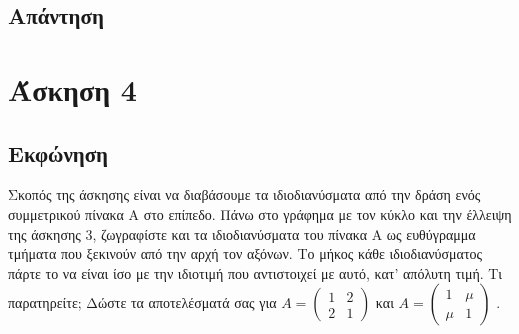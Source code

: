 \documentclass[a4paper,12pt]{article}
\begin{document}
\subsection{Απάντηση}
\newpage\section{Άσκηση 4}
\subsection{Εκφώνηση}
Σκοπός της άσκησης είναι να διαβάσουμε τα ιδιοδιανύσματα από την δράση ενός συμμετρικού πίνακα Α στο
επίπεδο. Πάνω στο γράφημα με τον κύκλο και την έλλειψη της άσκησης 3, ζωγραφίστε και τα ιδιοδιανύσματα
του πίνακα Α ως ευθύγραμμα τμήματα που ξεκινούν από την αρχή τον αξόνων. Το μήκος κάθε ιδιοδιανύσματος
πάρτε το να είναι ίσο με την ιδιοτιμή που αντιστοιχεί με αυτό, κατ' απόλυτη τιμή. Τι παρατηρείτε; Δώστε
τα αποτελέσματά σας για
$
    A=\begin{pmatrix}
        1 & 2 \\
        2 & 1
    \end{pmatrix}
$
και
$
    A=\begin{pmatrix}
        1   & \mu \\
        \mu & 1
    \end{pmatrix}
$
.
\end{document}
